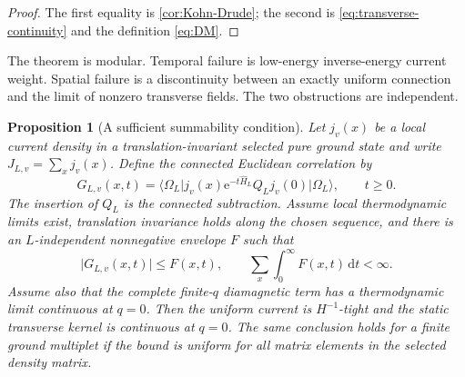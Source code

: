 \documentclass[11pt]{article}
\newtheorem{proposition}[theorem]{Proposition}
\theoremstyle{definition}
\theoremstyle{remark}
\newcommand{\dd}{\mathrm d}
\newcommand{\e}{\mathrm e}
\newcommand{\ket}[1]{\lvert #1\rangle}
\newcommand{\bra}[1]{\langle #1\rvert}
\newcommand{\abs}[1]{\lvert #1\rvert}
\begin{document}
\begin{proof}
The first equality is \cref{cor:Kohn-Drude}; the second is
\eqref{eq:transverse-continuity} and the definition \eqref{eq:DM}.
\end{proof}

The theorem is modular.  Temporal failure is low-energy inverse-energy current weight.  Spatial failure is
a discontinuity between an exactly uniform connection and the limit of nonzero transverse fields.  The two
obstructions are independent.

\begin{proposition}[A sufficient summability condition]
\label{prop:summability}
Let $j_v(x)$ be a local current density in a translation-invariant selected pure ground state and write
$J_{L,v}=\sum_xj_v(x)$.  Define the connected Euclidean correlation by
\begin{equation}
 G_{L,v}(x,t)
 =\bra{\Omega_L}j_v(x)\e^{-t\widehat H_L}Q_Lj_v(0)\ket{\Omega_L},
 \qquad t\ge0.
 \label{eq:Euclidean-correlation}
\end{equation}
The insertion of $Q_L$ is the connected subtraction.  Assume local thermodynamic limits exist,
translation invariance holds along the chosen sequence, and there is an $L$-independent nonnegative
envelope $F$ such that
\begin{equation}
 \abs{G_{L,v}(x,t)}\le F(x,t),
 \qquad
 \sum_x\int_0^\infty F(x,t)\,\dd t<\infty.
 \label{eq:summability}
\end{equation}
Assume also that the complete finite-$q$ diamagnetic term has a thermodynamic limit continuous at
$q=0$.  Then the uniform current is $H^{-1}$-tight and the static transverse kernel is continuous at
$q=0$.  The same conclusion holds for a finite ground multiplet if the bound is uniform for all matrix
elements in the selected density matrix.
\end{proposition}
\end{document}
